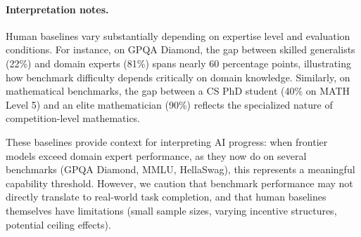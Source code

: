 \documentclass[letterpaper,twocolumn]{article}
\begin{document}
\paragraph{Interpretation notes.}
Human baselines vary substantially depending on expertise level and evaluation conditions. For instance, on GPQA Diamond, the gap between skilled generalists (22\%) and domain experts (81\%) spans nearly 60 percentage points, illustrating how benchmark difficulty depends critically on domain knowledge. Similarly, on mathematical benchmarks, the gap between a CS PhD student (40\% on MATH Level 5) and an elite mathematician (90\%) reflects the specialized nature of competition-level mathematics.

These baselines provide context for interpreting AI progress: when frontier models exceed domain expert performance, as they now do on several benchmarks (GPQA Diamond, MMLU, HellaSwag), this represents a meaningful capability threshold. However, we caution that benchmark performance may not directly translate to real-world task completion, and that human baselines themselves have limitations (small sample sizes, varying incentive structures, potential ceiling effects).
\end{document}

